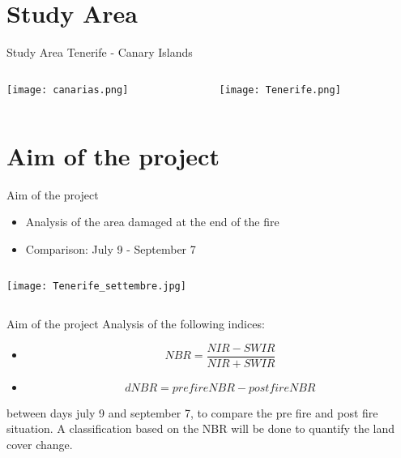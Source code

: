 \documentclass{beamer}
\begin{document}
\section{Study Area} 
\begin{frame}{Study Area}
Tenerife - Canary Islands
\begin{columns}
\begin{column}{0.5\textwidth}
\begin{center}
    \texttt{[image: canarias.png]}
\end{center}
\end{column}
\begin{column}{0.5\textwidth}  
    \begin{center}
     \texttt{[image: Tenerife.png]}
     \end{center}
\end{column}
\end{columns}
    
\end{frame}


\section{Aim of the project}

\begin{frame}{Aim of the project}
\begin{itemize}
    \item Analysis of the area damaged at the end of the fire
    \item Comparison: July 9 - September 7
\end{itemize}
\begin{column}{1\textwidth}
    \begin{center}
        \texttt{[image: Tenerife\_settembre.jpg]}
    \end{center}
\end{column}
\end{frame}

\begin{frame}{Aim of the project}
Analysis of the following indices:
\begin{itemize}
    \item \begin{equation}
NBR=\frac{NIR-SWIR}{NIR+SWIR}
    \end{equation}
    \item  \begin{equation}
dNBR=prefireNBR - postfireNBR
    \end{equation}
\end{itemize}
between days july 9 and september 7, to compare the pre fire and post fire situation. 
A classification based on the NBR will be done to quantify the land cover change. 
\end{frame}
\end{document}
